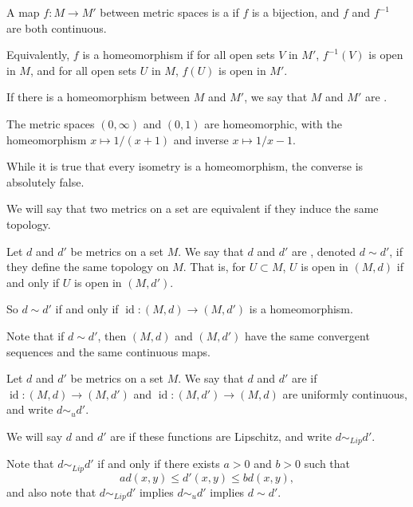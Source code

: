 \begin{definition}[Homeomorphism]
    A map $f: M \rightarrow M'$ between metric spaces is a  if $f$ is a bijection, and $f$ and $f^{-1}$ are both continuous.

    Equivalently, $f$ is a homeomorphism if for all open sets $V$ in $M'$, $f^{-1}(V)$ is open in $M$, and for all open sets $U$ in $M$, $f(U)$ is open in $M'$.

    If there is a homeomorphism between $M$ and $M'$, we say that $M$ and $M'$ are .
\end{definition}

\begin{example}
    The metric spaces $(0, \infty)$ and $(0, 1)$ are homeomorphic, with the homeomorphism $x \mapsto 1/(x + 1)$ and inverse $x \mapsto 1/x - 1$.
\end{example}

While it is true that every isometry is a homeomorphism, the converse is absolutely false.

We will say that two metrics on a set are equivalent if they induce the same topology.

\begin{definition}
    Let $d$ and $d'$ be metrics on a set $M$. We say that $d$ and $d'$ are , denoted $d \sim d'$, if they define the same topology on $M$. That is, for $U \subset M$, $U$ is open in $(M, d)$ if and only if $U$ is open in $(M, d')$.
\end{definition}

So $d \sim d'$ if and only if $\operatorname{id}: (M, d) \rightarrow (M, d')$ is a homeomorphism. 

Note that if $d \sim d'$, then $(M, d)$ and $(M, d')$ have the same convergent sequences and the same continuous maps.

\begin{definition}
    Let $d$ and $d'$ be metrics on a set $M$. We say that $d$ and $d'$ are  if $\operatorname{id}: (M, d) \rightarrow (M, d')$ and $\operatorname{id}: (M, d') \rightarrow (M, d)$ are uniformly continuous, and write $d \sim_u d'$.

    We will say $d$ and $d'$ are  if these functions are Lipschitz, and write $d \sim_{Lip} d'$.
\end{definition}

Note that $d \sim_{Lip} d'$ if and only if there exists $a > 0$ and $b > 0$ such that
$$
a d(x, y) \leq d'(x, y) \leq b d(x, y),
$$
and also note that $d \sim_{Lip} d'$ implies $d \sim_u d'$ implies $d \sim d'$.

